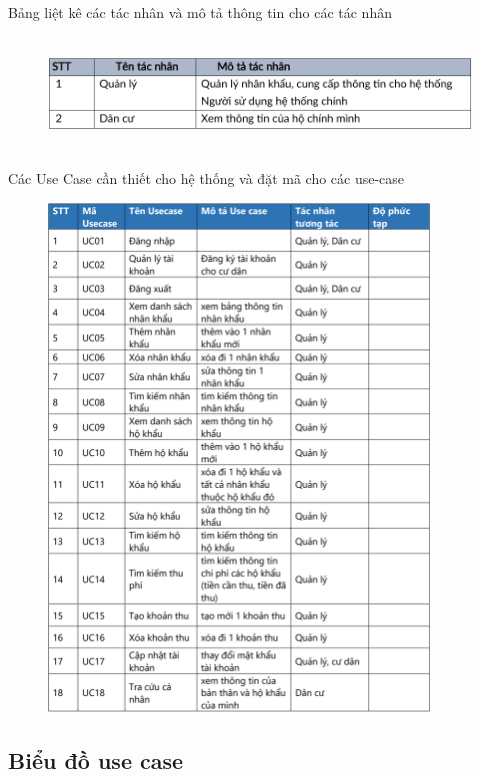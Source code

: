 \documentclass{article}
\begin{document}
Bảng liệt kê các tác nhân và mô tả thông tin cho các tác nhân
\begin{figure}[H]
    \centering
    \includegraphics[width=15.53cm, height = 3cm]{Ảnh chương 2/Bảng tác nhân.png}
\end{figure}
Các Use Case cần thiết cho hệ thống và đặt mã cho các use-case
\begin{figure}[H]
    \centering
    \includegraphics[width=0.9\textwidth]{Ảnh chương 2/Bảng usecase.png}
\end{figure}
\subsection{Biểu đồ use case} 
\end{document}
